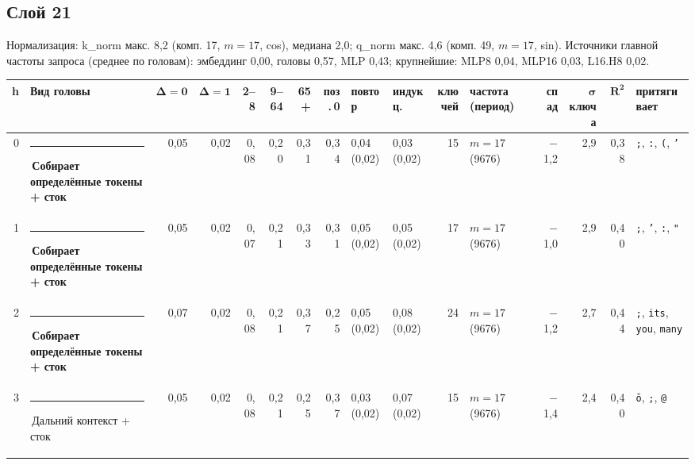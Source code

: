 \documentclass[10pt]{article}
\begin{document}
\par\vspace{0.4em}
\noindent\begin{minipage}{\linewidth}
\subsection*{Слой 21}
{\small\color{ink2} Нормализация: k\_norm макс. 8,2 (комп. 17, $m{=}17$, cos), медиана 2,0; q\_norm макс. 4,6 (комп. 49, $m{=}17$, sin). Источники главной частоты запроса (среднее по головам): эмбеддинг 0,00, головы 0,57, MLP 0,43; крупнейшие: MLP8 0,04, MLP16 0,03, L16.H8 0,02.}
\begin{center}{\footnotesize\begin{tabular}{|r|l|r|r|r|r|r|r|l|l|r|l|r|r|r|l|}
\hline
\rowcolor{head}\textbf{h} & \textbf{Вид головы} & $\boldsymbol{\Delta{=}0}$ & $\boldsymbol{\Delta{=}1}$ & \textbf{2–8} & \textbf{9–64} & \textbf{65+} & \textbf{поз.\,0} & \textbf{повтор} & \textbf{индукц.} & \textbf{ключей} & \textbf{частота (период)} & \textbf{спад} & $\boldsymbol{\sigma}$ \textbf{ключа} & $\boldsymbol{R^2}$ & \textbf{притягивает} \\ \hline
0 & \textcolor[HTML]{6250D6}{\rule{0.62em}{0.62em}}\,\textbf{Собирает определённые токены + сток} & 0,05 & 0,02 & 0,08 & 0,20 & 0,31 & 0,34 & 0,04 (0,02) & 0,03 (0,02) & 15 & $m{=}17$ (9676) & $-$1,2 & 2,9 & 0,38 & \texttt{\textvisiblespace{};}, \texttt{\textvisiblespace{}:}, \texttt{\textvisiblespace{}(}, \texttt{\textvisiblespace{}'} \\ \hline
1 & \textcolor[HTML]{6250D6}{\rule{0.62em}{0.62em}}\,\textbf{Собирает определённые токены + сток} & 0,05 & 0,02 & 0,07 & 0,21 & 0,33 & 0,31 & 0,05 (0,02) & 0,05 (0,02) & 17 & $m{=}17$ (9676) & $-$1,0 & 2,9 & 0,40 & \texttt{\textvisiblespace{};}, \texttt{\textvisiblespace{}'}, \texttt{\textvisiblespace{}:}, \texttt{\textvisiblespace{}"} \\ \hline
2 & \textcolor[HTML]{6250D6}{\rule{0.62em}{0.62em}}\,\textbf{Собирает определённые токены + сток} & 0,07 & 0,02 & 0,08 & 0,21 & 0,37 & 0,25 & 0,05 (0,02) & 0,08 (0,02) & 24 & $m{=}17$ (9676) & $-$1,2 & 2,7 & 0,44 & \texttt{\textvisiblespace{};}, \texttt{\textvisiblespace{}its}, \texttt{\textvisiblespace{}you}, \texttt{\textvisiblespace{}many} \\ \hline
3 & \textcolor[HTML]{C3C2B7}{\rule{0.62em}{0.62em}}\,Дальний контекст + сток & 0,05 & 0,02 & 0,08 & 0,21 & 0,25 & 0,37 & 0,03 (0,02) & 0,07 (0,02) & 15 & $m{=}17$ (9676) & $-$1,4 & 2,4 & 0,40 & \texttt{ō}, \texttt{\textvisiblespace{};}, \texttt{\textvisiblespace{}@} \\ \hline

\end{tabular}}
\end{center}
\end{minipage}
\end{document}
